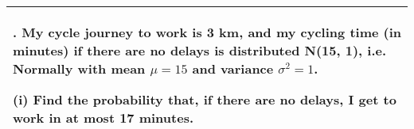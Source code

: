 \documentclass[a4paper,12pt]{article}
\begin{document}
\begin{table}[ht!]
     \centering
     \begin{tabular}{|p{15cm}|}
     \hline        
\noindent 4. My cycle journey to work is 3 km, and my cycling time (in minutes) if there are no delays is distributed N(15, 1), i.e. Normally with mean $\mu = 15$ and variance $\sigma^2 = 1$.

(i) Find the probability that, if there are no delays, I get to work in at most 17 minutes.

\\ \hline
      \end{tabular}
    \end{table}
\end{document}
